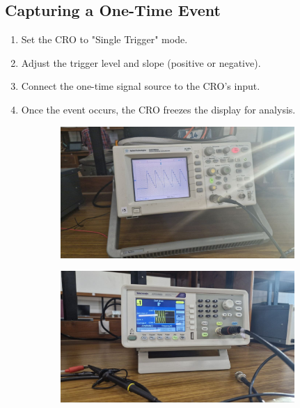 \documentclass[a4paper,12pt]{article}
\begin{document}
\subsection*{\color{myred}Capturing a One-Time Event}
\begin{enumerate}
    \item Set the CRO to "Single Trigger" mode.
    \item Adjust the trigger level and slope (positive or negative).
    \item Connect the one-time signal source to the CRO's input.
    \item Once the event occurs, the CRO freezes the display for analysis.
\end{enumerate}
\begin{figure}[H]
    \centering
    \begin{subfigure}{\textwidth}
        \centering
        \includegraphics[height=5cm]{figures/Capture_the_event/1/plot.jpg}
    \end{subfigure}%
    \begin{subfigure}{\textwidth}
        \centering
        \includegraphics[height=5cm]{figures/Capture_the_event/1/para.jpg}
    \end{subfigure}
\end{figure}
\end{document}
